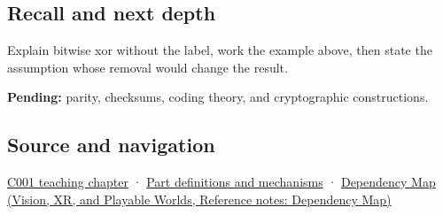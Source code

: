 \subsection{Recall and next depth}\label{appendix-d49161831368-recall-and-next-depth}

Explain bitwise xor without the label, work the example above, then state the assumption whose removal would change the result.

\textbf{Pending:} parity, checksums, coding theory, and cryptographic constructions.

\subsection{Source and navigation}\label{appendix-d49161831368-source-and-navigation}

\hyperref[01-foundations-i-ch001-from-a-signal-to-an-interpretation]{C001 teaching chapter} · \hyperref[appendix-fd090d982a15]{Part definitions and mechanisms} · \href{../07-Vision-XR-and-Playable-Worlds/main.pdf\#nameddest=appendix-4ad47bdd269a}{Dependency Map (Vision, XR, and Playable Worlds, Reference notes: Dependency Map)}
